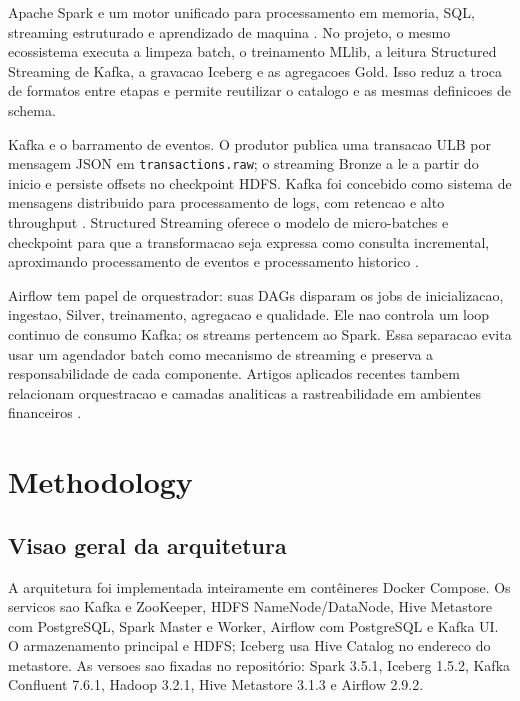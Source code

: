 \documentclass[10pt,twocolumn]{article}
\begin{document}
Apache Spark e um motor unificado para processamento em memoria, SQL, streaming estruturado e aprendizado de maquina \cite{zaharia2016}. No projeto, o mesmo ecossistema executa a limpeza batch, o treinamento MLlib, a leitura Structured Streaming de Kafka, a gravacao Iceberg e as agregacoes Gold. Isso reduz a troca de formatos entre etapas e permite reutilizar o catalogo e as mesmas definicoes de schema.

Kafka e o barramento de eventos. O produtor publica uma transacao ULB por mensagem JSON em \texttt{transactions.raw}; o streaming Bronze a le a partir do inicio e persiste offsets no checkpoint HDFS. Kafka foi concebido como sistema de mensagens distribuido para processamento de logs, com retencao e alto throughput \cite{kreps2011}. Structured Streaming oferece o modelo de micro-batches e checkpoint para que a transformacao seja expressa como consulta incremental, aproximando processamento de eventos e processamento historico \cite{akidau2015}.

Airflow tem papel de orquestrador: suas DAGs disparam os jobs de inicializacao, ingestao, Silver, treinamento, agregacao e qualidade. Ele nao controla um loop continuo de consumo Kafka; os streams pertencem ao Spark. Essa separacao evita usar um agendador batch como mecanismo de streaming e preserva a responsabilidade de cada componente. Artigos aplicados recentes tambem relacionam orquestracao e camadas analiticas a rastreabilidade em ambientes financeiros \cite{bfsilakehouse2023}.

\section{Methodology}

\subsection{Visao geral da arquitetura}

A arquitetura foi implementada inteiramente em contêineres Docker Compose. Os servicos sao Kafka e ZooKeeper, HDFS NameNode/DataNode, Hive Metastore com PostgreSQL, Spark Master e Worker, Airflow com PostgreSQL e Kafka UI. O armazenamento principal e HDFS; Iceberg usa Hive Catalog no endereco do metastore. As versoes sao fixadas no repositório: Spark 3.5.1, Iceberg 1.5.2, Kafka Confluent 7.6.1, Hadoop 3.2.1, Hive Metastore 3.1.3 e Airflow 2.9.2.

\begin{center}
\end{center}
\end{document}

